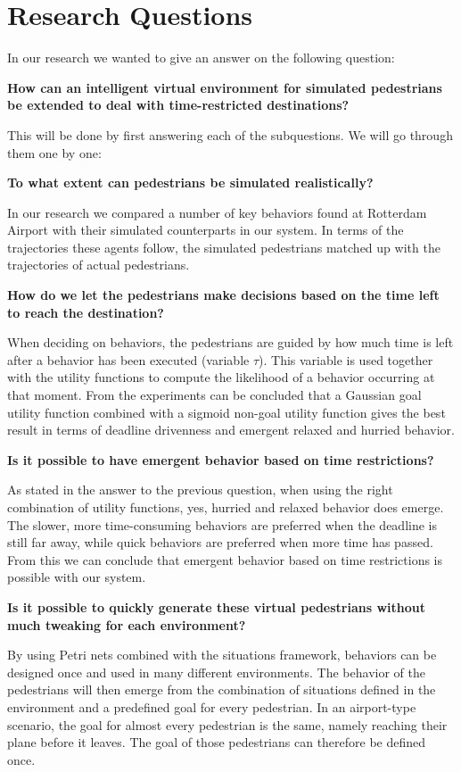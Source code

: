 \documentclass[11pt, a4paper]{book}
\begin{document}
\section{Research Questions}
In our research we wanted to give an answer on the following question:
\begin{center}
\textbf{How can an intelligent virtual environment for simulated pedestrians be extended to deal with time-restricted destinations?}
\end{center}
This will be done by first answering each of the subquestions. We will go through them one by one:
\begin{center}
\textbf{To what extent can pedestrians be simulated realistically?}
\end{center}
In our research we compared a number of key behaviors found at Rotterdam Airport with their simulated counterparts in our system. In terms of the trajectories these agents follow, the simulated pedestrians matched up with the trajectories of actual pedestrians. 
\begin{center}
\textbf{How do we let the pedestrians make decisions based on the time left to reach the destination?}
\end{center}
When deciding on behaviors, the pedestrians are guided by how much time is left after a behavior has been executed (variable $\tau$). This variable is used together with the utility functions to compute the likelihood of a behavior occurring at that moment. From the experiments can be concluded that a Gaussian goal utility function combined with a sigmoid non-goal utility function gives the best result in terms of deadline drivenness and emergent relaxed and hurried behavior.

\begin{center}
\textbf{Is it possible to have emergent behavior based on time restrictions?}
\end{center}
As stated in the answer to the previous question, when using the right combination of utility functions, yes, hurried and relaxed behavior does emerge. The slower, more time-consuming behaviors are preferred when the deadline is still far away, while quick behaviors are preferred when more time has passed. From this we can conclude that emergent behavior based on time restrictions is possible with our system.

\begin{center}
\textbf{Is it possible to quickly generate these virtual pedestrians without much tweaking for each environment?}
\end{center}
By using Petri nets combined with the situations framework, behaviors can be designed once and used in many different environments. The behavior of the pedestrians will then emerge from the combination of situations defined in the environment and a predefined goal for every pedestrian. In an airport-type scenario, the goal for almost every pedestrian is the same, namely reaching their plane before it leaves. The goal of those pedestrians can therefore be defined once.
\end{document}

